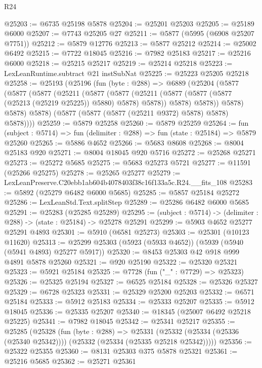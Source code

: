 \begin{lexlean}{R24}
\begin{coremodule}
@25203 := @6735 @25198 @5878
@25204 := @25201 @25203
@25205 := @25189 @6000
@25207 := @7743 @25205 @27
@25211 := @5877 (@5995 (@6908 @25207 @7751))
@25212 := @5879 @12776
@25213 := @5877 @25212
@25214 := @25002 @6492
@25215 := @7722 @18045
@25216 := @7982 @25183
@25217 := @25216 @6000
@25218 := @25215 @25217
@25219 := @25214 @25218
@25223 := LexLeanRuntime.subtract @21 instSubNat
@25225 := @25223 @25205 @25218
@25258 := @25193
    (@25196
      (fun (byte : @288) =>
      @6889
        (@25204
          (@5877
            (@5877
              (@5877
                (@25211
                  (@5877
                    (@5877
                      (@25211 (@5877 (@5877 (@5877 (@25213 (@25219 @25225)) @5880) @5878) @5878))
                      @5878)
                    @5878))
                @5878)
              @5878)
            @5878)
          (@5877 (@5877 (@5877 (@25211 @9372) @5878) @5878) @5878))))
@25259 := @5879 @25258
@25260 := @5879 @25259
@25264 := fun (subject : @5714) => fun (delimiter : @288) => fun (state : @25184) => @5879 @25260
@25265 := @5886 @4652
@25266 := @5683 @8608
@25268 := @8004 @25183 @920
@25271 := @8004 @18045 @920 @5716
@25272 := @25268 @25271
@25273 := @25272 @5685
@25275 := @5683 @25273 @5721
@25277 := @11591 (@25266 @25275)
@25278 := @25265 @25277
@25279 := LexLeanPreserve.C20ebb1ab604b4078403f38c16f133a5c.R24.__fits_108
@25283 := @5892 (@25279 @6482 @6000 @5685)
@25285 := @5857 @25184 @25272
@25286 := LexLeanStd.Text.splitStep
@25289 := @25286 @6482 @6000 @5685
@25291 := @25283 (@25285 @25289)
@25295 := (subject : @5714) -> (delimiter : @288) -> (state : @25184) -> @25278 @25291
@25299 := @5903 @4652 @25277 @25291 @4893
@25301 := @5910 (@6581 @25273)
@25303 := @25301 (@10123 @11620)
@25313 := @25299 @25303 (@5923 (@5933 @4652)) (@5939 (@5940 (@5941 @4893) @25277 @5917))
@25320 := @8453 @25303 @42 @918 @999 @4891 @5878 @25260
@25321 := @920 @25190
@25322 := @25320 @25321
@25323 := @5921 @25184
@25325 := @7728 (fun ("_" : @7729) => @25323)
@25326 := @25325 @25194
@25327 := @6525 @25184
@25328 := @25326 @25327
@25329 := @6728 @25323
@25331 := @25329 @25200 @25203
@25332 := @6571 @25184
@25333 := @5912 @25183
@25334 := @25333 @25207
@25335 := @5912 @18045
@25336 := @25335 @25207
@25340 := @18345 (@25007 @6492 @25218 @25225)
@25341 := @7982 @18045
@25342 := @25341 @25217
@25355 := @25285
    (@25328
      (fun (byte : @288) =>
      @25331 (@25332 (@25334 (@25336 (@25340 @25342)))) (@25332 (@25334 (@25335 @25218 @25342)))))
@25356 := @25322 @25355
@25360 := @8131 @25303 @375 @5878 @25321
@25361 := @25216 @5685
@25362 := @25271 @25361

\end{coremodule}
\end{lexlean}
